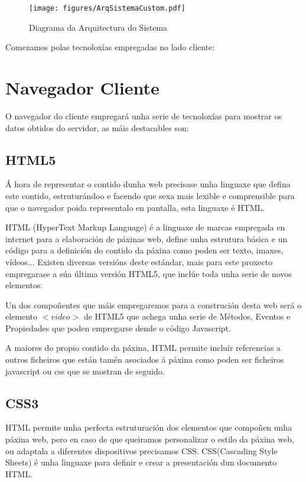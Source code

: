     \begin{figure}[htp]
    \begin{center}
        \texttt{[image: figures/ArqSistemaCustom.pdf]}
        \caption{Diagrama da Arquitectura do Sistema}
    \label{fig:ArqSistemaCustom}
    \end{center}
    \end{figure}
    
    Comezamos polas tecnoloxías empregadas no lado cliente:
    \section{Navegador Cliente}
    
    O navegador do cliente empregará unha serie de tecnoloxías para mostrar os datos obtidos do 
    servidor, as máis destacables son:
    
    \subsection{HTML5}
        Á hora de representar o contido dunha web precisase unha linguaxe que defina este contido,
        estruturándoo e facendo que sexa mais lexible e comprensible para que o navegador poida 
        representalo en pantalla, esta linguaxe é HTML.
        
        HTML (HyperText Markup Language) é a linguaxe de marcas empregada en internet para a elaboración
        de páxinas web, define unha estrutura básica e un código para a definición do contido da páxina
        como poden ser texto, imaxes, vídeos... Existen diversas versións deste estándar, mais para este
        proxecto empregarase a súa última versión HTML5, que inclúe toda unha serie de novos elementos.
        
        Un dos compoñentes que máis empregaremos para a construción desta web será o elemento 
        $<video>$ de HTML5 que achega unha serie de Métodos, Eventos e Propiedades
        \cite{w3school-video-events} que poden empregarse dende o código Javascript.
        
        A maiores do propio contido da páxina, HTML permite incluír referencias a outros ficheiros que 
        están tamén asociados á páxina como poden ser ficheiros javascript ou css que se mostran de 
        seguido.
    
    \subsection{CSS3}
        HTML permite unha perfecta estruturación dos elementos que compoñen unha páxina web, pero 
        en caso de que queiramos personalizar o estilo da páxina web, ou adaptala a diferentes 
        dispositivos precisamos CSS. CSS(Cascading Style Sheets) é unha linguaxe para definir e 
        crear a presentación dun documento HTML.
        
